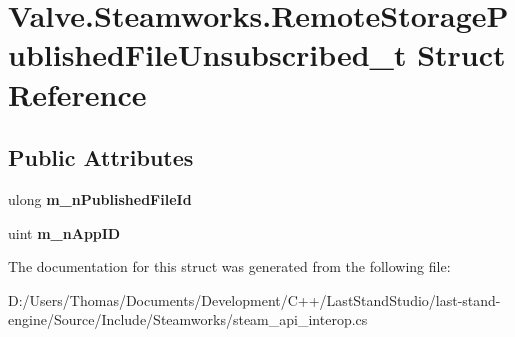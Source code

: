 \hypertarget{structValve_1_1Steamworks_1_1RemoteStoragePublishedFileUnsubscribed__t}{}\section{Valve.\+Steamworks.\+Remote\+Storage\+Published\+File\+Unsubscribed\+\_\+t Struct Reference}
\label{structValve_1_1Steamworks_1_1RemoteStoragePublishedFileUnsubscribed__t}
\subsection*{Public Attributes}
\begin{DoxyCompactItemize}
\item 
\hypertarget{structValve_1_1Steamworks_1_1RemoteStoragePublishedFileUnsubscribed__t_a62190ecd8bf6f381724a7acdc0097ad7}{}ulong {\bfseries m\+\_\+n\+Published\+File\+Id}\label{structValve_1_1Steamworks_1_1RemoteStoragePublishedFileUnsubscribed__t_a62190ecd8bf6f381724a7acdc0097ad7}

\item 
\hypertarget{structValve_1_1Steamworks_1_1RemoteStoragePublishedFileUnsubscribed__t_a8e53d620ee6b0e1865796fae4af45e62}{}uint {\bfseries m\+\_\+n\+App\+I\+D}\label{structValve_1_1Steamworks_1_1RemoteStoragePublishedFileUnsubscribed__t_a8e53d620ee6b0e1865796fae4af45e62}

\end{DoxyCompactItemize}


The documentation for this struct was generated from the following file\+:\begin{DoxyCompactItemize}
\item 
D\+:/\+Users/\+Thomas/\+Documents/\+Development/\+C++/\+Last\+Stand\+Studio/last-\/stand-\/engine/\+Source/\+Include/\+Steamworks/steam\+\_\+api\+\_\+interop.\+cs\end{DoxyCompactItemize}
